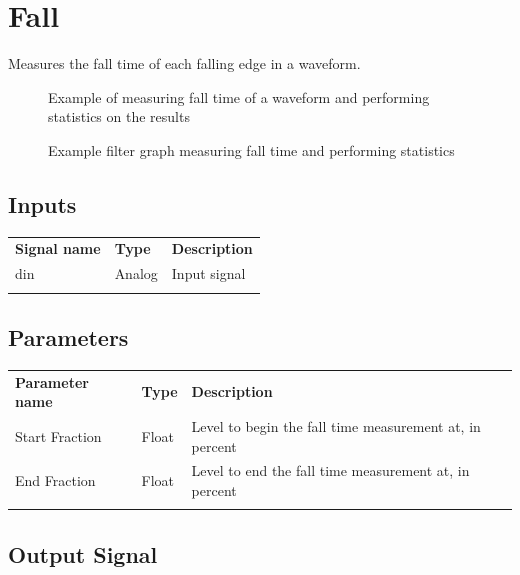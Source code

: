 \pagebreak
\section{Fall}
\label{filter:fall}

Measures the fall time of each falling edge in a waveform.

\begin{figure}[h]
\centering
{}
\caption{Example of measuring fall time of a waveform and performing statistics on the results}
\label{filter_fall}
\end{figure}

\begin{figure}[h]
\centering
{}
\caption{Example filter graph measuring fall time and performing statistics}
\label{filter_graph_fall}
\end{figure}
\FloatBarrier

\subsection{Inputs}

\begin{tabularx}{16cm}{llX}
\thickhline
\textbf{Signal name} & \textbf{Type} & \textbf{Description} \\
\thickhline
din & Analog & Input signal\\
\thickhline
\end{tabularx}

\subsection{Parameters}

\begin{tabularx}{16cm}{llX}
\thickhline
\textbf{Parameter name} & \textbf{Type} & \textbf{Description} \\
\thickhline
Start Fraction & Float & Level to begin the fall time measurement at, in percent\\
\thinhline
End Fraction & Float & Level to end the fall time measurement at, in percent\\
\thickhline
\end{tabularx}

\subsection{Output Signal}

